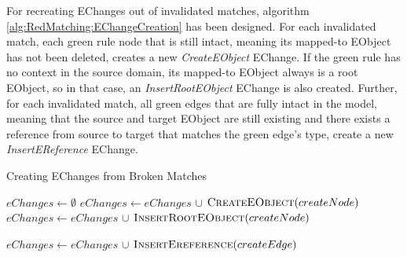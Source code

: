 For recreating EChanges out of invalidated matches, algorithm \autoref{alg:RedMatching:EChangeCreation} has been designed.
For each invalidated match, each green rule node that is still intact, meaning its mapped-to EObject has not been deleted, creates a new \emph{CreateEObject} EChange.
If the green rule has no context in the source domain, its mapped-to EObject always is a root EObject, so in that case, an \emph{InsertRootEObject} EChange is also created.
Further, for each invalidated match, all green edges that are fully intact in the model, meaning that the source and target EObject are still existing and there exists a reference from source to target that matches the green edge's type, create a new \emph{InsertEReference} EChange.

\begin{algorithm}
    \caption{Creating EChanges from Broken Matches}
    \label{alg:RedMatching:EChangeCreation}
    \begin{algorithmic}
            \State $eChanges \gets \emptyset$
                \State $eChanges \gets eChanges$ $\cup$ $\Call{CreateEObject}{createNode}$
                    \State $eChanges \gets eChanges$ $\cup$ $\Call{InsertRootEObject}{createNode}$
                \EndIf
            \EndFor
            
                \State $eChanges \gets eChanges$ $\cup$ $\Call{InsertEreference}{createEdge}$
            \EndFor
            \State {}
        \EndFunction
    \end{algorithmic}    
\end{algorithm}
